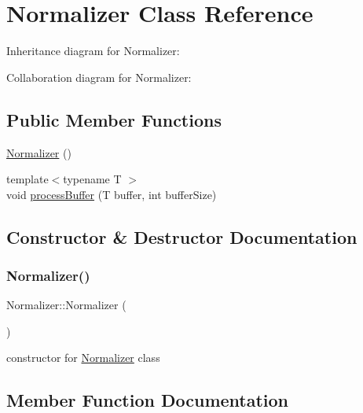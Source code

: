 \hypertarget{classNormalizer}{}\section{Normalizer Class Reference}
\label{classNormalizer}


Inheritance diagram for Normalizer\+:


Collaboration diagram for Normalizer\+:
\subsection*{Public Member Functions}
\begin{DoxyCompactItemize}
\item 
\hyperlink{classNormalizer_af576151323854ff0d4d7e37255c397d1}{Normalizer} ()
\item 
{\footnotesize template$<$typename T $>$ }\\void \hyperlink{classNormalizer_aaef27fc4d06b2d51a1c17e349ca9ab85}{process\+Buffer} (T buffer, int buffer\+Size)
\end{DoxyCompactItemize}


\subsection{Constructor \& Destructor Documentation}
\mbox{\label{classNormalizer_af576151323854ff0d4d7e37255c397d1}} 
\subsubsection{\texorpdfstring{Normalizer()}{Normalizer()}}
{\footnotesize\ttfamily Normalizer\+::\+Normalizer (\begin{DoxyParamCaption}{ }\end{DoxyParamCaption})}

constructor for \hyperlink{classNormalizer}{Normalizer} class 

\subsection{Member Function Documentation}
\mbox{\label{classNormalizer_aaef27fc4d06b2d51a1c17e349ca9ab85}} 
